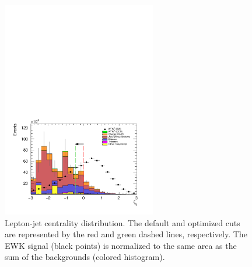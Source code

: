 \begin{figure}[htp]
  \centering
  \includegraphics[width=0.6\textwidth]{figs/ssww_upgrade/optimization_plots/centrality}
  \caption{Lepton-jet centrality distribution.  The default and optimized cuts are represented by the red and green dashed lines, respectively.  The \ssww EWK signal (black points) is normalized to the same area as the sum of the backgrounds (colored histogram).}
  \label{fig:optimized_centrality}
\end{figure}

